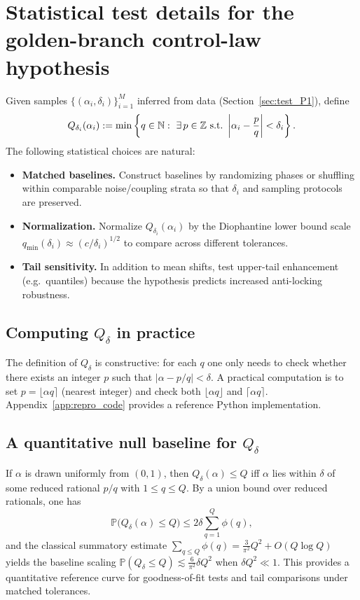 \section{Statistical test details for the golden-branch control-law hypothesis}
\label{app:golden_tests}

Given samples $\{(\alpha_i,\delta_i)\}_{i=1}^M$ inferred from data (Section~\ref{sec:test_P1}), define
\begin{equation}
  Q_{\delta_i}(\alpha_i)
  := \min\left\{q\in\NN:\ \exists\,p\in\ZZ\ \text{s.t.}\ \left|\alpha_i-\frac{p}{q}\right|<\delta_i\right\}.
\end{equation}
The following statistical choices are natural:
\begin{itemize}
  \item \textbf{Matched baselines.} Construct baselines by randomizing phases or shuffling within comparable noise/coupling strata so that $\delta_i$ and sampling protocols are preserved.
  \item \textbf{Normalization.} Normalize $Q_{\delta_i}(\alpha_i)$ by the Diophantine lower bound scale $q_{\min}(\delta_i)\approx \left(c/\delta_i\right)^{1/2}$ to compare across different tolerances.
  \item \textbf{Tail sensitivity.} In addition to mean shifts, test upper-tail enhancement (e.g.\ quantiles) because the hypothesis predicts increased anti-locking robustness.
\end{itemize}

\subsection{Computing \texorpdfstring{$Q_\delta$}{Qdelta} in practice}
\label{app:qdelta_computation}

The definition of $Q_\delta$ is constructive: for each $q$ one only needs to check whether there exists an integer $p$ such that $|\alpha-p/q|<\delta$.
A practical computation is to set $p=\lfloor \alpha q\rceil$ (nearest integer) and check both $\lfloor \alpha q\rfloor$ and $\lceil \alpha q\rceil$.
Appendix~\ref{app:repro_code} provides a reference Python implementation.

\subsection{A quantitative null baseline for \texorpdfstring{$Q_\delta$}{Qdelta}}
\label{app:qdelta_null}

If $\alpha$ is drawn uniformly from $(0,1)$, then $Q_\delta(\alpha)\le Q$ iff $\alpha$ lies within $\delta$ of some reduced rational $p/q$ with $1\le q\le Q$.
By a union bound over reduced rationals, one has
\begin{equation}
  \mathbb{P}\bigl(Q_\delta(\alpha)\le Q\bigr)
  \le 2\delta\sum_{q=1}^{Q}\phi(q),
\end{equation}
and the classical summatory estimate $\sum_{q\le Q}\phi(q)=\frac{3}{\pi^2}Q^2+O(Q\log Q)$ \cite{HardyWright2008} yields the baseline scaling $\mathbb{P}(Q_\delta\le Q)\lesssim \frac{6}{\pi^2}\delta Q^2$ when $\delta Q^2\ll 1$.
This provides a quantitative reference curve for goodness-of-fit tests and tail comparisons under matched tolerances.

